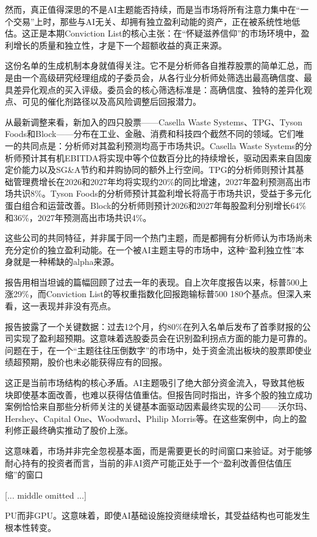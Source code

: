 \documentclass[11pt]{ctexart}
\begin{document}
然而，真正值得深思的不是AI主题能否持续，而是当市场将所有注意力集中在“一个交易”上时，那些与AI无关、却拥有独立盈利动能的资产，正在被系统性地低估。这正是本期Conviction List的核心主张：在“怀疑滋养信仰”的市场环境中，盈利增长的质量和独立性，才是下一个超额收益的真正来源。

这份名单的生成机制本身就值得关注。它不是分析师各自推荐股票的简单汇总，而是由一个高级研究经理组成的子委员会，从各行业分析师处筛选出最高确信度、最具差异化观点的买入评级。委员会的核心筛选标准是：高确信度、独特的差异化观点、可见的催化剂路径以及高风险调整后回报潜力。

从最新调整来看，新加入的四只股票——Casella Waste Systems、TPG、Tyson Foods和Block——分布在工业、金融、消费和科技四个截然不同的领域。它们唯一的共同点是：分析师对其盈利预测均高于市场共识。Casella Waste Systems的分析师预计其有机EBITDA将实现中等个位数百分比的持续增长，驱动因素来自固废定价能力以及SG\&A节约和并购协同的额外上行空间。TPG的分析师则预计其基础管理费增长在2026和2027年均将实现约20\%的同比增速，2027年盈利预测高出市场共识8\%。Tyson Foods的分析师预计其盈利增长将高于市场共识，受益于多元化蛋白组合和运营改善。Block的分析师则预计2026和2027年每股盈利分别增长64\%和36\%，2027年预测高出市场共识4\%。

这些公司的共同特征，并非属于同一个热门主题，而是都拥有分析师认为市场尚未充分定价的独立盈利动能。在一个被AI主题主导的市场中，这种“盈利独立性”本身就是一种稀缺的alpha来源。

报告用相当坦诚的篇幅回顾了过去一年的表现。自上次年度报告以来，标普500上涨29\%，而Conviction List的等权重指数化回报跑输标普500 180个基点。但深入来看，这一表现并非没有亮点。

报告披露了一个关键数据：过去12个月，约80\%在列入名单后发布了首季财报的公司实现了盈利超预期。这意味着选股委员会在识别盈利拐点方面的能力是可靠的。问题在于，在一个“主题往往压倒数字”的市场中，处于资金流出板块的股票即使业绩超预期，股价也未必能获得应有的回报。

这正是当前市场结构的核心矛盾。AI主题吸引了绝大部分资金流入，导致其他板块即使基本面改善，也难以获得估值重估。但报告同时指出，许多个股的独立成功案例恰恰来自那些分析师关注的关键基本面驱动因素最终实现的公司——沃尔玛、Hershey、Capital One、Woodward、Philip Morris等。在这些案例中，向上的盈利修正最终确实推动了股价上涨。

这意味着，市场并非完全忽视基本面，而是需要更长的时间窗口来验证。对于能够耐心持有的投资者而言，当前的非AI资产可能正处于一个“盈利改善但估值压缩”的窗口

[... middle omitted ...]

PU而非GPU。这意味着，即使AI基础设施投资继续增长，其受益结构也可能发生根本性转变。
\end{document}
